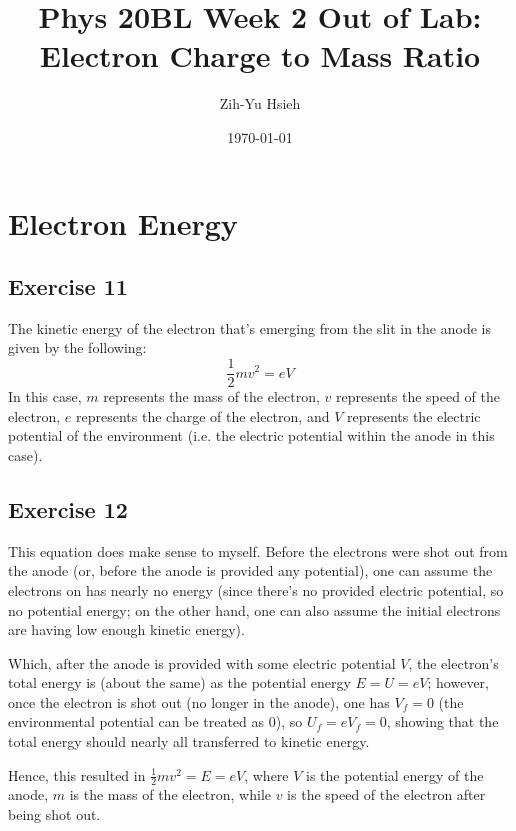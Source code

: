 \documentclass{article}
\title{Phys 20BL Week 2 Out of Lab: Electron Charge to Mass Ratio}
\author{Zih-Yu Hsieh}
\date{\today}
\begin{document}
\maketitle

\tableofcontents

\newpage

\section{Electron Energy}
\subsection{Exercise 11}
The kinetic energy of the electron that's emerging from the slit in the anode is given by the following:
\begin{equation}
    \frac{1}{2}mv^2 = e V
\end{equation}
In this case, $m$ represents the mass of the electron, $v$ represents the speed of the electron, $e$ represents the charge of the electron, and $V$ represents the electric potential of the environment (i.e. the electric potential within the anode in this case).

\hfil

\subsection{Exercise 12}

This equation does make sense to myself. Before the electrons were shot out from the anode (or, before the anode is provided any potential), one can assume the electrons on has nearly no energy (since there's no provided electric potential, so no potential energy; on the other hand, one can also assume the initial electrons are having low enough kinetic energy).

Which, after the anode is provided with some electric potential $V$, the electron's total energy is (about the same) as the potential energy $E = U = e V$; however, once the electron is shot out (no longer in the anode), one has $V_f = 0$ (the environmental potential can be treated as $0$), so $U_f = e V_f = 0$, showing that the total energy should nearly all transferred to kinetic energy. 

Hence, this resulted in $\frac{1}{2}mv^2 = E = e V$, where $V$ is the potential energy of the anode, $m$ is the mass of the electron, while $v$ is the speed of the electron after being shot out.

\hfil
\end{document}
